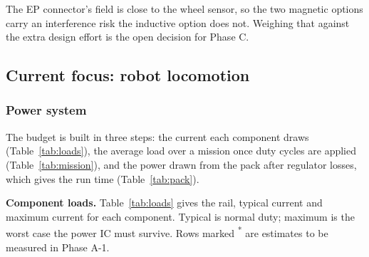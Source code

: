 \documentclass[12pt,a4paper]{article}
\begin{document}
The EP connector's field is close to the wheel sensor, so the two magnetic
options carry an interference risk the inductive option does not. Weighing
that against the extra design effort is the open decision for Phase C.

\subsection{Current focus: robot locomotion}
\label{sec:locomotion}

\subsubsection{Power system}
\label{sec:power-system}

The budget is built in three steps: the current each component draws
(Table~\ref{tab:loads}), the average load over a mission once duty cycles are
applied (Table~\ref{tab:mission}), and the power drawn from the pack after
regulator losses, which gives the run time (Table~\ref{tab:pack}).

\noindent\textbf{Component loads.} Table~\ref{tab:loads} gives the rail,
typical current and maximum current for each component. Typical is normal
duty; maximum is the worst case the power IC must survive. Rows marked
\textsuperscript{*} are estimates to be measured in Phase A-1.
\end{document}
